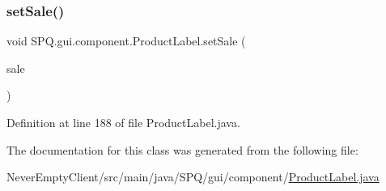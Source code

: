 \subsubsection{\texorpdfstring{set\+Sale()}{setSale()}}
{\footnotesize\ttfamily void S\+P\+Q.\+gui.\+component.\+Product\+Label.\+set\+Sale (\begin{DoxyParamCaption}\item[{J\+Label}]{sale }\end{DoxyParamCaption})}



Definition at line 188 of file Product\+Label.\+java.



The documentation for this class was generated from the following file\+:\begin{DoxyCompactItemize}
\item 
Never\+Empty\+Client/src/main/java/\+S\+P\+Q/gui/component/\mbox{\hyperlink{_product_label_8java}{Product\+Label.\+java}}\end{DoxyCompactItemize}
